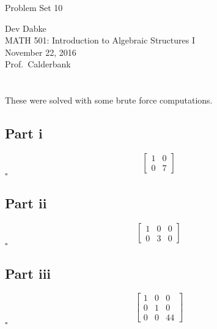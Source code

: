 \documentclass[letterpaper]{article}
\newcommand*{\QED}{\hfill\ensuremath{\square}}%
\def\name{Problem Set 10}
\begin{document}
{\huge \name}


\vspace{0.25in}

Dev Dabke \\
MATH 501: Introduction to Algebraic Structures I \\
November 22, 2016 \\
Prof.\ Calderbank \\

\section{}
\label{sec:Question1}

These were solved with some brute force computations.

\subsection{Part i}
\label{subsec:1Parti}

\[
\begin{bmatrix}
    1 & 0 \\
    0 & 7
\end{bmatrix}
\]
\QED{}

\subsection{Part ii}
\label{subsec:1Partii}

\[
\begin{bmatrix}
    1 & 0 & 0 \\
    0 & 3 & 0
\end{bmatrix}
\]
\QED{}

\subsection{Part iii}
\label{subsec:1Partiii}

\[
\begin{bmatrix}
    1 & 0 & 0 \\
    0 & 1 & 0 \\
    0 & 0 & 44
\end{bmatrix}
\]
\QED{}


\section{}
\label{sec:Question2}
\end{document}
